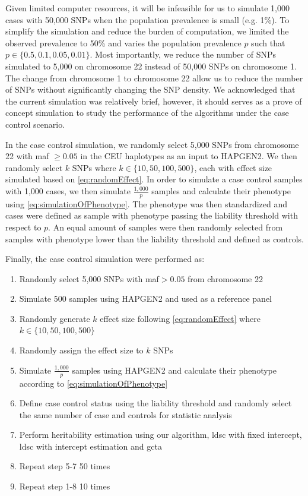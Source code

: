 		Given limited computer resources, it will be infeasible for us to simulate 1,000 cases with 50,000 \glspl{SNP} when the population prevalence is small (e.g. 1\%).
		To simplify the simulation and reduce the burden of computation, we limited the observed prevalence to 50\% and varies the population prevalence $p$ such that $p\in\{0.5, 0.1, 0.05, 0.01\}$.
		Most importantly, we reduce the number of \glspl{SNP} simulated to 5,000 on chromosome 22 instead of 50,000 \glspl{SNP} on chromosome 1. 
		The change from chromosome 1 to chromosome 22 allow us to reduce the number of \glspl{SNP} without significantly changing the \gls{SNP} density. 
		We acknowledged that the current simulation was relatively brief, however, it should serves as a prove of concept simulation to study the performance of the algorithms under the case control scenario.
		
		In the case control simulation, we randomly select 5,000 \glspl{SNP} from chromosome 22 with \gls{maf} $\ge0.05$ in the \gls{CEU} haplotypes as an input to HAPGEN2. 
		We then randomly select $k$ \glspl{SNP} where $k\in\{10,50,100,500\}$, each with effect size simulated based on \cref{eq:randomEffect}.
		In order to simulate a case control samples with 1,000 cases, we then simulate $\frac{1,000}{p}$ samples and calculate their phenotype using \cref{eq:simulationOfPhenotype}.
		The phenotype was then standardized and cases were defined as sample with phenotype passing the liability threshold with respect to $p$.
		An equal amount of samples were then randomly selected from samples with phenotype lower than the liability threshold and defined as controls.
			
		Finally, the case control simulation were performed as:
		\begin{enumerate}
			\item Randomly select 5,000 \glspl{SNP} with \gls{maf}$>0.05$ from chromosome 22
			\item Simulate 500 samples using HAPGEN2 and used as a reference panel
			\item Randomly generate $k$ effect size following \cref{eq:randomEffect} where $k\in\{10,50,100,500\}$
			\item Randomly assign the effect size to $k$ \glspl{SNP}
			\item Simulate $\frac{1,000}{p}$ samples using HAPGEN2 and calculate their phenotype according to \cref{eq:simulationOfPhenotype}
			\item Define case control status using the liability threshold and randomly select the same number of case and controls for statistic analysis
			\item Perform heritability estimation using our algorithm, \gls{ldsc} with fixed intercept, \gls{ldsc} with intercept estimation and \gls{gcta}
			\item Repeat step 5-7 50 times
			\item Repeat step 1-8 10 times
		\end{enumerate}
		
